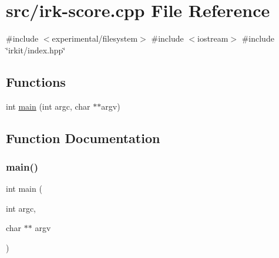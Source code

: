 \hypertarget{irk-score_8cpp}{}\section{src/irk-\/score.cpp File Reference}
\label{irk-score_8cpp}
{\ttfamily \#include $<$experimental/filesystem$>$}\newline
{\ttfamily \#include $<$iostream$>$}\newline
{\ttfamily \#include \char`\"{}irkit/index.\+hpp\char`\"{}}\newline
\subsection*{Functions}
\begin{DoxyCompactItemize}
\item 
int \hyperlink{irk-score_8cpp_a3c04138a5bfe5d72780bb7e82a18e627}{main} (int argc, char $\ast$$\ast$argv)
\end{DoxyCompactItemize}


\subsection{Function Documentation}
\mbox{\label{irk-score_8cpp_a3c04138a5bfe5d72780bb7e82a18e627}} 
\subsubsection{\texorpdfstring{main()}{main()}}
{\footnotesize\ttfamily int main (\begin{DoxyParamCaption}\item[{int}]{argc,  }\item[{char $\ast$$\ast$}]{argv }\end{DoxyParamCaption})}

